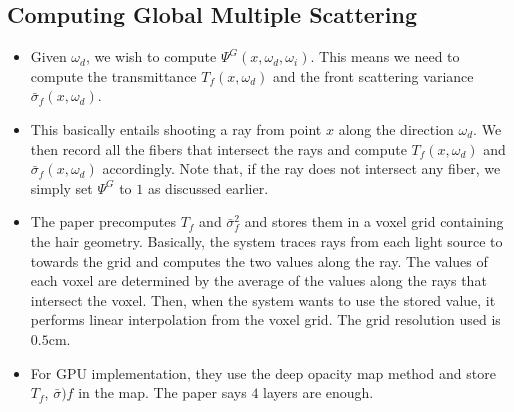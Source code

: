 \documentclass[10pt]{article}
\begin{document}
  \subsection{Computing Global Multiple Scattering}
  \begin{itemize}
    \item Given $\omega_d$, we wish to compute $\Psi^G(x, \omega_d, \omega_i)$.  This means we need to compute the transmittance $T_f(x, \omega_d)$ and the front scattering variance $\bar{\sigma}_f(x, \omega_d)$.

    \item This basically entails shooting a ray from point $x$ along the direction $\omega_d$. We then record all the fibers that intersect the rays and compute $T_f(x, \omega_d)$ and $\bar{\sigma}_f(x, \omega_d)$ accordingly.  Note that, if the ray does not intersect any fiber, we simply set $\Psi^G$ to $1$ as discussed earlier.

    \item The paper precomputes $T_f$ and $\bar{\sigma}_f^2$ and stores them in a voxel grid containing the hair geometry.  Basically, the system traces rays from each light source to towards the grid and computes the two values along the ray.  The values of each voxel are determined by the average of the values along the rays that intersect the voxel.  Then, when the system wants to use the stored value, it performs linear interpolation from the voxel grid.  The grid resolution used is $0.5$cm.

    \item For GPU implementation, they use the deep opacity map method \cite{Yuksel:2008} and store $T_f$, $\bar{\sigma})f$ in the map.  The paper says $4$ layers are enough.
  \end{itemize}
\end{document}
